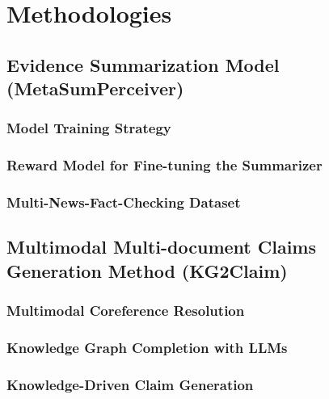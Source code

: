 \documentclass[doublespace,nopageskip]{VTthesis}
\begin{document}
    \chapter{Methodologies} \label{ch:methods}
                
        \section{Evidence Summarization Model (MetaSumPerceiver)} \label{se:ESM}

            \subsection{Model Training Strategy} \label{subse:MTS}
                
            \subsection{Reward Model for Fine-tuning the Summarizer} \label{subse:reward}
                
            \subsection{Multi-News-Fact-Checking Dataset} \label{subse:MNFCD}
                

        \section{Multimodal Multi-document Claims Generation Method (KG2Claim)} \label{se:MMCGM}
        
            \subsection{Multimodal Coreference Resolution} \label{subse:EECR}
                
            \subsection{Knowledge Graph Completion with LLMs} \label{se:KGC_LLM}
                
            \subsection{Knowledge-Driven Claim Generation}
            \label{se:KDCG}
                
                
\end{document}
